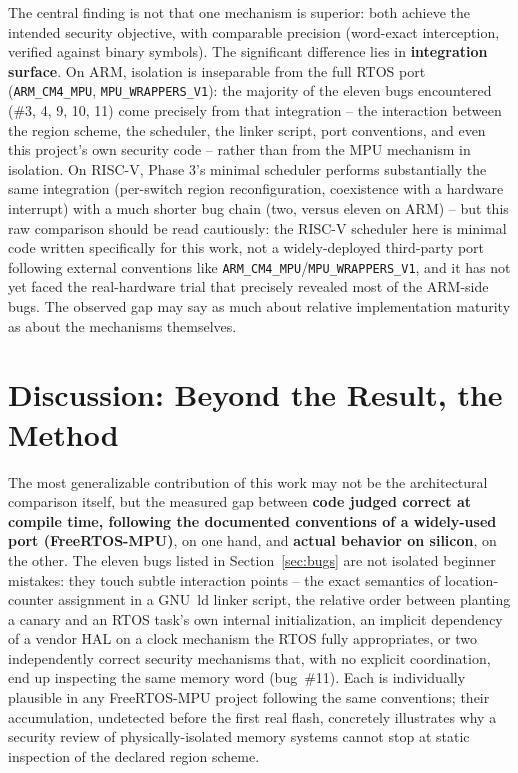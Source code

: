 \documentclass[sigconf,nonacm]{acmart}
\begin{document}
The central finding is not that one mechanism is superior: both achieve the intended security objective, with comparable precision (word-exact interception, verified against binary symbols). The significant difference lies in \textbf{integration surface}. On ARM, isolation is inseparable from the full RTOS port (\texttt{ARM\_CM4\_MPU}, \texttt{MPU\_WRAPPERS\_V1}): the majority of the eleven bugs encountered (\#3, 4, 9, 10, 11) come precisely from that integration -- the interaction between the region scheme, the scheduler, the linker script, port conventions, and even this project's own security code -- rather than from the MPU mechanism in isolation. On RISC-V, Phase 3's minimal scheduler performs substantially the same integration (per-switch region reconfiguration, coexistence with a hardware interrupt) with a much shorter bug chain (two, versus eleven on ARM) -- but this raw comparison should be read cautiously: the RISC-V scheduler here is minimal code written specifically for this work, not a widely-deployed third-party port following external conventions like \texttt{ARM\_CM4\_MPU}/\texttt{MPU\_WRAPPERS\_V1}, and it has not yet faced the real-hardware trial that precisely revealed most of the ARM-side bugs. The observed gap may say as much about relative implementation maturity as about the mechanisms themselves.

\section{Discussion: Beyond the Result, the Method}

The most generalizable contribution of this work may not be the architectural comparison itself, but the measured gap between \textbf{code judged correct at compile time, following the documented conventions of a widely-used port (FreeRTOS-MPU)}, on one hand, and \textbf{actual behavior on silicon}, on the other. The eleven bugs listed in Section~\ref{sec:bugs} are not isolated beginner mistakes: they touch subtle interaction points -- the exact semantics of location-counter assignment in a GNU~ld linker script, the relative order between planting a canary and an RTOS task's own internal initialization, an implicit dependency of a vendor HAL on a clock mechanism the RTOS fully appropriates, or two independently correct security mechanisms that, with no explicit coordination, end up inspecting the same memory word (bug~\#11). Each is individually plausible in any FreeRTOS-MPU project following the same conventions; their accumulation, undetected before the first real flash, concretely illustrates why a security review of physically-isolated memory systems cannot stop at static inspection of the declared region scheme.
\end{document}
